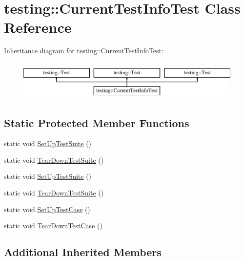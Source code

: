 \hypertarget{classtesting_1_1_current_test_info_test}{}\section{testing\+::Current\+Test\+Info\+Test Class Reference}
\label{classtesting_1_1_current_test_info_test}
Inheritance diagram for testing\+::Current\+Test\+Info\+Test\+:\begin{figure}[H]
\begin{center}
\leavevmode
\includegraphics[height=2.000000cm]{dc/d04/classtesting_1_1_current_test_info_test}
\end{center}
\end{figure}
\subsection*{Static Protected Member Functions}
\begin{DoxyCompactItemize}
\item 
static void \mbox{\hyperlink{classtesting_1_1_current_test_info_test_a96ea319066279ee9a8472b8581fa7bbf}{Set\+Up\+Test\+Suite}} ()
\item 
static void \mbox{\hyperlink{classtesting_1_1_current_test_info_test_a6d4688ba63080fe8fc44a6677503de76}{Tear\+Down\+Test\+Suite}} ()
\item 
static void \mbox{\hyperlink{classtesting_1_1_current_test_info_test_a96ea319066279ee9a8472b8581fa7bbf}{Set\+Up\+Test\+Suite}} ()
\item 
static void \mbox{\hyperlink{classtesting_1_1_current_test_info_test_a6d4688ba63080fe8fc44a6677503de76}{Tear\+Down\+Test\+Suite}} ()
\item 
static void \mbox{\hyperlink{classtesting_1_1_current_test_info_test_a61bad7ce29923afd464daf9684b6269e}{Set\+Up\+Test\+Case}} ()
\item 
static void \mbox{\hyperlink{classtesting_1_1_current_test_info_test_a9a80a5a3e6e70c619870c2ae9df892a6}{Tear\+Down\+Test\+Case}} ()
\end{DoxyCompactItemize}
\subsection*{Additional Inherited Members}


